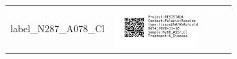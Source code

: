 \documentclass[10pt,notitlepage,letterpaper]{article}
\def\s{\phantom{xx}}
\def\w{1.27in}
\def\h{-0.030in}
\begin{document}
\begin{tabular}[t]{ c @{\s} c @{\s} c @{\s} c @{\s} c }
{label_N287_A078_Cl} & \includegraphics[width=\w]{label_N288_A157_Cl} \\[\h]

\end{tabular}
\end{document}
